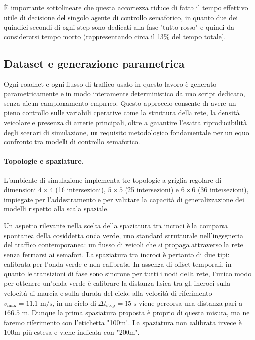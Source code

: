 È importante sottolineare che questa accortezza riduce di fatto il tempo effettivo utile di decisione del singolo agente di controllo semaforico, in quanto due dei quindici secondi di ogni step sono
dedicati alla fase "tutto-rosso" e quindi da considerarsi tempo morto (rappresentando circa il 13\% del tempo totale).

\subsection{Dataset e generazione parametrica}
\label{subsec:dataset}

Ogni roadnet e ogni flusso di traffico usato in questo lavoro è generato
parametricamente e in modo interamente deterministico da uno script dedicato,
senza alcun campionamento empirico.
Questo approccio consente di avere un pieno controllo sulle variabili operative come la
struttura della rete, la densità veicolare e presenza di arterie principali, oltre a
garantire l'esatta riproducibilità degli scenari di simulazione, un requisito metodologico fondamentale
per un equo confronto tra modelli di controllo semaforico.

\paragraph{Topologie e spaziature.}
L'ambiente di simulazione implementa tre topologie a griglia regolare di dimensioni $4\times4$ (16 intersezioni),
$5\times5$ (25 intersezioni) e $6\times6$ (36 intersezioni), impiegate per l'addestramento e per valutare la capacità di generalizzazione
dei modelli rispetto alla scala spaziale.

Un aspetto rilevante nella scelta della spaziatura tra incroci è la
comparsa spontanea della cosiddetta onda verde, uno standard strutturale
nell'ingegneria del traffico contemporanea: un flusso di veicoli che si
propaga attraverso la rete senza fermarsi ai semafori. La spaziatura tra
incroci è pertanto di due tipi: calibrata per l'onda verde e non
calibrata. In assenza di offset temporali, in quanto le transizioni di
fase sono sincrone per tutti i nodi della rete, l'unico modo per ottenere
un'onda verde è calibrare la distanza fisica tra gli incroci sulla
velocità di marcia e sulla durata del ciclo: alla velocità di riferimento
$v_{\max} = 11.1 \text{ m/s}$, in un ciclo di $\Delta t_{\text{step}} = 15
  \text{ s}$ viene percorsa una distanza pari a $166.5 \text{ m}$. Dunque
la prima spaziatura proposta è proprio di questa misura, ma ne faremo
riferimento con l'etichetta "100m". La spaziatura non calibrata invece è
100m più estesa e viene indicata con "200m".

